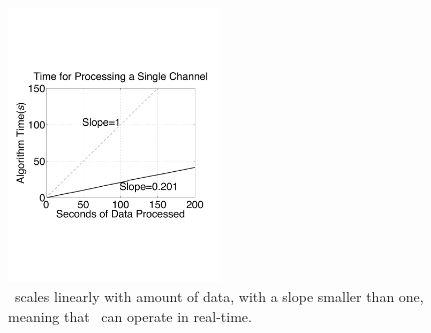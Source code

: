 \begin{center}
\begin{figure}[h!]
\includegraphics[width=0.5\textwidth]{../figs/new/timingsinglechannel.pdf}
\caption{\smug\ scales linearly with amount of data, with a slope smaller than one, meaning that \smug\ can operate in real-time. } \label{fig:timing}
\end{figure}
\end{center}

